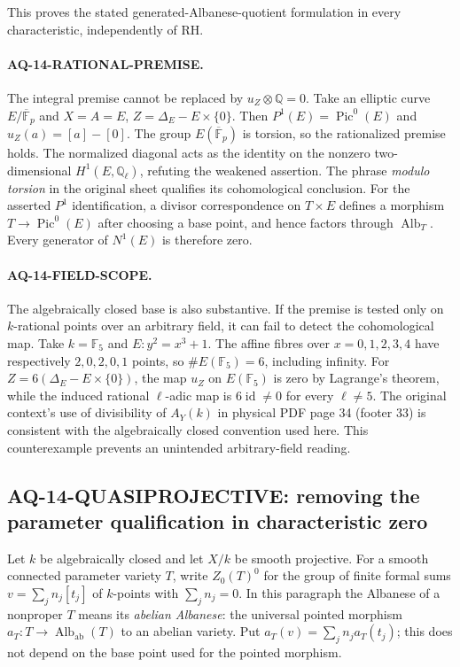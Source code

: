 This proves the stated generated-Albanese-quotient formulation
in every characteristic, independently of RH.

\paragraph{AQ-14-RATIONAL-PREMISE.}
The integral premise cannot be replaced by $u_Z\otimes\mathbb Q=0$.
Take an elliptic curve $E/\overline{\mathbb F}_p$ and
$X=A=E$, $Z=\Delta_E-E\times\{0\}$.
Then $P^1(E)=\operatorname{Pic}^0(E)$ and
$u_Z(a)=[a]-[0]$. The group $E(\overline{\mathbb F}_p)$ is
torsion, so the rationalized premise holds. The normalized
diagonal acts as the identity on the nonzero two-dimensional
$H^1(E,\mathbb Q_\ell)$, refuting the weakened assertion.
The phrase \emph{modulo torsion} in the original sheet
qualifies its cohomological conclusion.
For the asserted $P^1$ identification, a divisor
correspondence on $T\times E$ defines a morphism
$T\to\operatorname{Pic}^0(E)$ after choosing a base point,
and hence factors through $\operatorname{Alb}_T$.
Every generator of $N^1(E)$ is therefore zero.

\paragraph{AQ-14-FIELD-SCOPE.}
The algebraically closed base is also substantive.
If the premise is tested only on $k$-rational points
over an arbitrary field, it can fail to detect the
cohomological map. Take $k=\mathbb F_5$ and
$E:y^2=x^3+1$. The affine fibres over
$x=0,1,2,3,4$ have respectively $2,0,2,0,1$
points, so $\#E(\mathbb F_5)=6$, including infinity.
For $Z=6(\Delta_E-E\times\{0\})$, the map
$u_Z$ on $E(\mathbb F_5)$ is zero by Lagrange's
theorem, while the induced rational $\ell$-adic
map is $6\operatorname{id}\ne0$ for every $\ell\ne5$.
The original context's use of divisibility of
$A_Y(k)$ in physical PDF page 34 (footer 33)
is consistent with the algebraically closed
convention used here. This counterexample prevents
an unintended arbitrary-field reading.

\subsection{AQ-14-QUASIPROJECTIVE: removing the parameter qualification in characteristic zero}
Let $k$ be algebraically closed and let $X/k$ be smooth projective.
For a smooth connected parameter variety $T$, write
$Z_0(T)^0$ for the group of finite formal sums
$v=\sum_jn_j[t_j]$ of $k$-points with $\sum_jn_j=0$.
In this paragraph the Albanese of a nonproper $T$ means its
\emph{abelian Albanese}: the universal pointed morphism
$a_T:T\to\operatorname{Alb}_{\mathrm{ab}}(T)$ to an abelian
variety. Put $a_T(v)=\sum_jn_ja_T(t_j)$; this does not depend
on the base point used for the pointed morphism.

